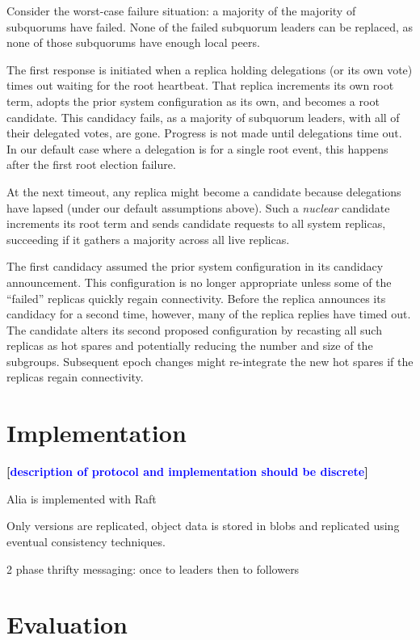 \documentclass[10pt,conference]{IEEEtran}
\newcommand{\sub}{subquorum\xspace}
\newcommand{\subs}{subquorums\xspace}
\renewcommand{\pjk}[1]{{\bf
    [\marginpar[\hbox{{\textcolor{blue}{pjk}}\raisebox{0ex}{\Huge $\rightarrow$}}]%
{\hbox{\raisebox{0ex}{\Huge $\leftarrow$}{\textcolor{blue}{pjk}}}}\textcolor{blue}{#1}]}}
\begin{document}
Consider the worst-case failure situation: a majority of the majority of \subs have
failed.
None of the failed \sub leaders can be replaced, as none of those \subs have
enough local peers.

The first response is initiated when a replica holding delegations (or its own
vote) times out waiting for the root heartbeat.
That replica increments its own root term, adopts the prior system
configuration as its own, and becomes a root candidate.
This candidacy fails, as a majority of \sub leaders, with all of their
delegated votes, are gone.
Progress is not made until delegations time out.
In our default case where a delegation is for a single root event, this
happens after the first root election failure.

At the next timeout, any replica might become a candidate because delegations have
lapsed (under our default assumptions above).
Such a \emph{nuclear} candidate increments its root term and
sends candidate requests to all system replicas,
succeeding if it gathers a majority across all live replicas.

The first candidacy assumed the prior system configuration in its candidacy
announcement.
This configuration is no longer appropriate unless some of the ``failed''
replicas quickly regain connectivity.
Before the replica announces its candidacy for a second time, however, many of
the replica replies have timed out.
The candidate alters its second proposed configuration by recasting all such
replicas as hot spares and potentially reducing the number and size of the
subgroups.
Subsequent epoch changes might re-integrate the new hot spares if the replicas
regain connectivity.

\section{Implementation}
\label{section:implementation}

\pjk{description of protocol and implementation should be discrete}

Alia is implemented with Raft

Only versions are replicated, object data is stored in blobs and replicated using
eventual consistency techniques.

2 phase thrifty messaging: once to leaders then to followers

\section{Evaluation}
\label{section:evaluation}
\end{document}
